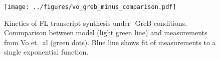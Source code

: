 \begin{figure}
    \begin{center}
        \texttt{[image: ../figures/vo\_greb\_minus\_comparison.pdf]}
    \end{center}
    \caption{Kinetics of FL transcript synthesis under -GreB conditions.
      Commparison between model (light green line) and measurements from Vo
      et.\ al \cite{vo_vitro_2003-1} (green dots). Blue line shows fit of
      measurements to a single exponential function.}
\label{fig:vo_comparison}
\end{figure}

